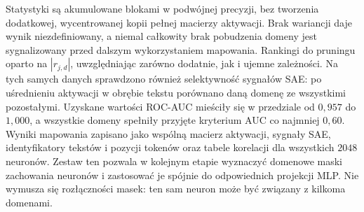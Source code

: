 Statystyki są akumulowane blokami w podwójnej precyzji, bez tworzenia dodatkowej, wycentrowanej kopii pełnej macierzy aktywacji. Brak wariancji daje wynik niezdefiniowany, a niemal całkowity brak pobudzenia domeny jest sygnalizowany przed dalszym wykorzystaniem mapowania. Rankingi do pruningu oparto na $|r_{j,d}|$, uwzględniając zarówno dodatnie, jak i ujemne zależności. \newline
Na tych samych danych sprawdzono również selektywność sygnałów SAE: po uśrednieniu aktywacji w obrębie tekstu porównano daną domenę ze wszystkimi pozostałymi. Uzyskane wartości ROC-AUC mieściły się w przedziale od $0{,}957$ do $1{,}000$, a wszystkie domeny spełniły przyjęte kryterium AUC co najmniej $0{,}60$. \newline
Wyniki mapowania zapisano jako wspólną macierz aktywacji, sygnały SAE, identyfikatory tekstów i pozycji tokenów oraz tabele korelacji dla wszystkich $2048$ neuronów. Zestaw ten pozwala w kolejnym etapie wyznaczyć domenowe maski zachowania neuronów i zastosować je spójnie do odpowiednich projekcji MLP. Nie wymusza się rozłączności masek: ten sam neuron może być związany z kilkoma domenami.